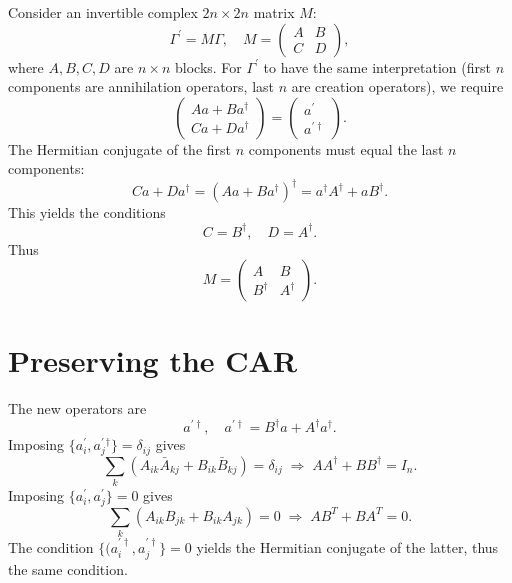 \documentclass[aps,pre,twocolumn,floatfix,superscriptaddress,10pt]{revtex4}
\begin{document}
Consider an invertible complex $2n\times 2n$ matrix $M$: 
\begin{equation}
\Gamma ^{\prime }=M\Gamma ,\quad M=%
\begin{pmatrix}
A & B \\ 
C & D%
\end{pmatrix}%
,
\end{equation}%
where $A,B,C,D$ are $n\times n$ blocks. For $\Gamma ^{\prime }$ to have the
same interpretation (first $n$ components are annihilation operators, last $n
$ are creation operators), we require 
\begin{equation}
\begin{pmatrix}
Aa+Ba^{\dagger } \\ 
Ca+Da^{\dagger }%
\end{pmatrix}%
=%
\begin{pmatrix}
a^{\prime } \\ 
a^{\prime \dagger }%
\end{pmatrix}%
.
\end{equation}%
The Hermitian conjugate of the first $n$ components must equal the last $n$
components: 
\begin{equation}
Ca+Da^{\dagger }=(Aa+Ba^{\dagger })^{\dagger }=a^{\dagger }A^{\dagger
}+aB^{\dagger }.
\end{equation}%
This yields the conditions 
\begin{equation}
C=B^{\dagger },\quad D=A^{\dagger }.
\end{equation}%
Thus 
\begin{equation}
M=%
\begin{pmatrix}
A & B \\ 
B^{\dagger } & A^{\dagger }%
\end{pmatrix}%
.
\end{equation}

\section{Preserving the CAR}

The new operators are 
\begin{equation}
a^{\prime \dagger },\quad a^{\prime \dagger }=B^{\dagger }a+A^{\dagger
}a^{\dagger }.
\end{equation}%
Imposing $\{a_{i}^{\prime },a_{j}^{\prime }{}^{\dagger }\}=\delta _{ij}$
gives 
\begin{equation}
\sum_{k}(A_{ik}\bar{A}_{kj}+B_{ik}\bar{B}_{kj})=\delta
_{ij}\;\Longrightarrow \;AA^{\dagger }+BB^{\dagger }=I_{n}.
\end{equation}%
Imposing $\{a_{i}^{\prime },a_{j}^{\prime }\}=0$ gives 
\begin{equation}
\sum_{k}(A_{ik}B_{jk}+B_{ik}A_{jk})=0\;\Longrightarrow \;AB^{T}+BA^{T}=0.
\end{equation}%
The condition $\{(a_{i}^{\prime \dagger },a_{j}^{\prime \dagger }\}=0$
yields the Hermitian conjugate of the latter, thus the same condition.
\end{document}
